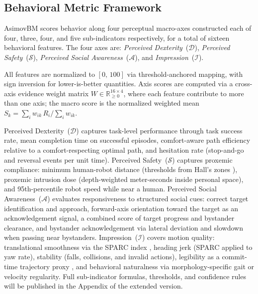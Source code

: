 \documentclass[conference]{IEEEtran}
\begin{document}
\subsection{Behavioral Metric Framework}

AsimovBM scores behavior along four perceptual macro-axes constructed each of
four, three, four, and five sub-indicators respectively, for a total of sixteen
behavioral features.
The four axes are: \textit{Perceived Dexterity}~($\mathcal{D}$),
\textit{Perceived Safety}~($\mathcal{S}$),
\textit{Perceived Social Awareness}~($\mathcal{A}$), and
\textit{Impression}~($\mathcal{I}$).

All features are normalized to $[0,\,100]$ via threshold-anchored
mapping, with sign inversion for lower-is-better
quantities. %
Axis scores are computed via a cross-axis evidence weight matrix
$W\!\in\!\mathbb{R}^{16\times 4}_{\geq 0}$, where each feature contribute
to more than one axis; the macro score is the normalized weighted mean
$S_k = \sum_i w_{ik}\,R_i / \sum_i w_{ik}$.

Perceived Dexterity~($\mathcal{D}$) captures task-level performance through
task success rate, mean completion time on successful episodes, comfort-aware
path efficiency relative to a comfort-respecting optimal path, and hesitation
rate (stop-and-go and reversal events per unit time).
Perceived Safety~($\mathcal{S}$) captures proxemic compliance: minimum
human-robot distance (thresholds from Hall's zones \cite{hall1966hidden}), proxemic intrusion
dose (depth-weighted meter-seconds inside personal space), and 95th-percentile
robot speed while near a human.
Perceived Social Awareness~($\mathcal{A}$) evaluates responsiveness to
structured social cues: correct target identification and approach,
forward-axis orientation toward the target as an acknowledgement signal,
a combined score of target progress and bystander clearance, and bystander
acknowledgement via lateral deviation and slowdown when passing near bystanders.
Impression~($\mathcal{I}$) covers motion quality: translational smoothness
via the SPARC index \cite{balasubramanian2012sparc}, heading jerk (SPARC applied to yaw rate),
stability (falls, collisions, and invalid actions), legibility as a
commit-time trajectory proxy \cite{dragan2013legibility}, and behavioral naturalness via
morphology-specific gait or velocity regularity.
Full sub-indicator formulas, thresholds, and confidence rules %
will be published in the Appendix of the extended version.
\end{document}

